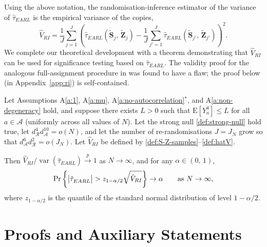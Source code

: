 \documentclass[sigconf,nonacm]{acmart}
\newcommand{\E}{\mathrm E}
\DeclareMathOperator{\var}{var}
\begin{document}
Using the above notation, the randomisation-inference estimator of the variance of $\hat\tau^{\phantom{1}}_{EARL}$ is the empirical variance of the copies,
\begin{equation}\label{def:hatV}
    \hat V_{RI} = \frac{1}{J} \sum_{j=1}^J\left(\hat\tau^{\phantom{1}}_{EARL}(\tilde {\mathbf S}_j,\,\tilde{\mathbf Z}_j)-\frac 1 J\sum_{j'=1}^J\hat\tau^{\phantom{1}}_{EARL}(\tilde {\mathbf S}_{j'},\,\tilde{\mathbf Z}_{j'})\right)^2.
\end{equation}
We complete our theoretical development with a theorem demonstrating that $\hat V_{RI}$ can be used for significance testing based on $\hat\tau^{\phantom{1}}_{EARL}$. The validity proof for the analogous full-assignment procedure in \cite{shi2025scalableanalysisbipartiteexperiments} was found to have a flaw; the proof below (in Appendix~\ref{app:ri}) is self-contained.

\begin{theorem}\label{th:randomisation-inference}
    Let Assumptions A\ref{a:1}, A\ref{a:mu}, A\ref{a:no-autocorrelation}$^*$, and A\ref{a:non-degeneracy} hold, and suppose there exists $L>0$ such that $\E[Y_a^4] \le L$ for all $a\in\mathcal A$ (uniformly across all values of $N$). Let the strong null \eqref{def:strong-null} hold true, let $d^{4}_{\mathcal{R}}d^{10}_{\mathcal{A}}=o(N)$, and let the number of re-randomisations $J=J_N$ grow so that $d^{6}_{\mathcal{A}}d^{2}_{\mathcal{R}}=o(J_N)$. Let $\hat V_{RI}$ be defined by \eqref{def:S-Z-samples}--\eqref{def:hatV}.

    Then $\hat V_{RI} / \var(\hat\tau^{\phantom{1}}_{EARL})\stackrel{p}{\to} 1$ as $N\to\infty$, and
    for any $\alpha\in(0,\,1)$,
    \begin{equation*}
        \Pr\left\{\left|\hat\tau^{\phantom{1}}_{EARL}\right| > z_{1-\alpha/2}\sqrt{\hat V_{RI}}\right\}\to \alpha \qquad \textup{as }N\to\infty,
    \end{equation*}
    where $z_{1-\alpha/2}$ is the quantile of the standard normal distribution of level $1-\alpha/2$.
\end{theorem}


\appendix

\section{Proofs and Auxiliary Statements}\label{app:proofs}
\end{document}
